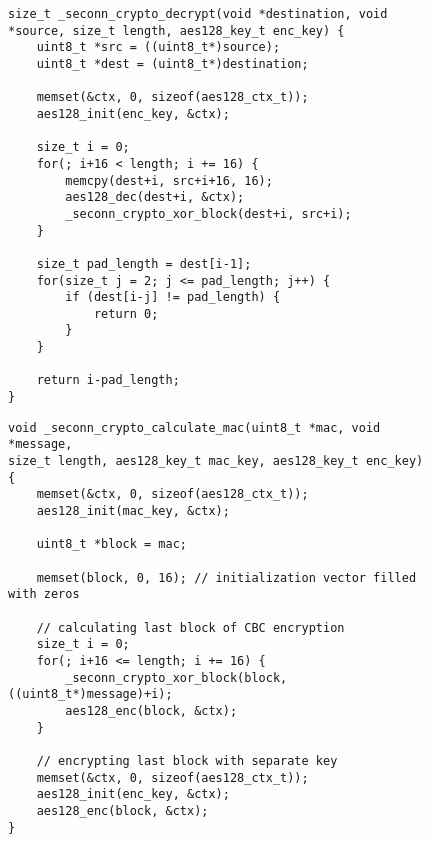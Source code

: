\begin{figure}
\begin{lstlisting}[caption={Odszyfrowanie CBC wraz z obsługą dopełnienia PKCS\#7},label={lst:decrypt}]
size_t _seconn_crypto_decrypt(void *destination, void *source, size_t length, aes128_key_t enc_key) {
    uint8_t *src = ((uint8_t*)source);
    uint8_t *dest = (uint8_t*)destination;

    memset(&ctx, 0, sizeof(aes128_ctx_t));
    aes128_init(enc_key, &ctx);

    size_t i = 0;
    for(; i+16 < length; i += 16) {
        memcpy(dest+i, src+i+16, 16);
        aes128_dec(dest+i, &ctx);
        _seconn_crypto_xor_block(dest+i, src+i);
    }

    size_t pad_length = dest[i-1];
    for(size_t j = 2; j <= pad_length; j++) {
        if (dest[i-j] != pad_length) {
            return 0;
        }
    }

    return i-pad_length;
}
\end{lstlisting}
\end{figure}

\begin{figure}
\begin{lstlisting}[caption={Obliczanie \gls{mac} dla wiadomości},label={lst:mac}]
void _seconn_crypto_calculate_mac(uint8_t *mac, void *message,
size_t length, aes128_key_t mac_key, aes128_key_t enc_key) {
    memset(&ctx, 0, sizeof(aes128_ctx_t));
    aes128_init(mac_key, &ctx);

    uint8_t *block = mac;

    memset(block, 0, 16); // initialization vector filled with zeros

    // calculating last block of CBC encryption
    size_t i = 0;
    for(; i+16 <= length; i += 16) {
        _seconn_crypto_xor_block(block, ((uint8_t*)message)+i);
        aes128_enc(block, &ctx);
    }

    // encrypting last block with separate key
    memset(&ctx, 0, sizeof(aes128_ctx_t));
    aes128_init(enc_key, &ctx);
    aes128_enc(block, &ctx);
}
\end{lstlisting}
\end{figure}
